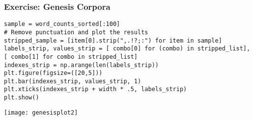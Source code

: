 \begin{frame}[fragile]\frametitle{Exercise: Genesis Corpora}
{\small
\begin{lstlisting}
sample = word_counts_sorted[:100]
# Remove punctuation and plot the results
stripped_sample = [item[0].strip(",.!?;:") for item in sample]
labels_strip, values_strip = [ combo[0] for (combo) in stripped_list],[ combo[1] for combo in stripped_list]
indexes_strip = np.arange(len(labels_strip))
plt.figure(figsize=([20,5]))
plt.bar(indexes_strip, values_strip, 1)
plt.xticks(indexes_strip + width * .5, labels_strip)
plt.show()
\end{lstlisting}}
\begin{center}
\texttt{[image: genesisplot2]}
\end{center}
\end{frame}





